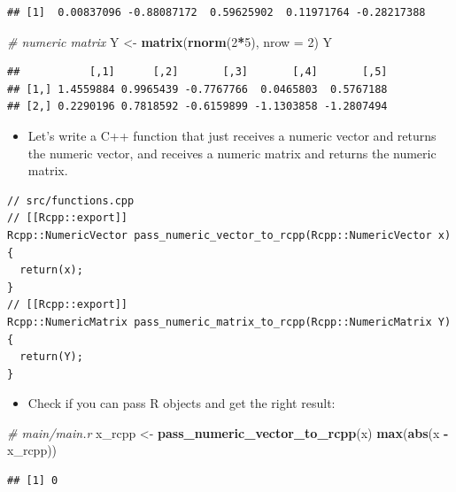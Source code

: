 \documentclass[]{book}
\newenvironment{Shaded}{\begin{snugshade}}{\end{snugshade}}
\newcommand{\KeywordTok}[1]{\textcolor[rgb]{0.13,0.29,0.53}{\textbf{#1}}}
\newcommand{\DataTypeTok}[1]{\textcolor[rgb]{0.13,0.29,0.53}{#1}}
\newcommand{\DecValTok}[1]{\textcolor[rgb]{0.00,0.00,0.81}{#1}}
\newcommand{\StringTok}[1]{\textcolor[rgb]{0.31,0.60,0.02}{#1}}
\newcommand{\CommentTok}[1]{\textcolor[rgb]{0.56,0.35,0.01}{\textit{#1}}}
\newcommand{\OperatorTok}[1]{\textcolor[rgb]{0.81,0.36,0.00}{\textbf{#1}}}
\newcommand{\NormalTok}[1]{#1}
\providecommand{\tightlist}{%
  \setlength{\itemsep}{0pt}\setlength{\parskip}{0pt}}
\begin{document}
\begin{verbatim}
## [1]  0.00837096 -0.88087172  0.59625902  0.11971764 -0.28217388
\end{verbatim}

\begin{Shaded}
\begin{Highlighting}[]
\CommentTok{# numeric matrix}
\NormalTok{Y <-}\StringTok{ }\KeywordTok{matrix}\NormalTok{(}\KeywordTok{rnorm}\NormalTok{(}\DecValTok{2}\OperatorTok{*}\DecValTok{5}\NormalTok{), }\DataTypeTok{nrow =} \DecValTok{2}\NormalTok{)}
\NormalTok{Y}
\end{Highlighting}
\end{Shaded}

\begin{verbatim}
##           [,1]      [,2]       [,3]       [,4]       [,5]
## [1,] 1.4559884 0.9965439 -0.7767766  0.0465803  0.5767188
## [2,] 0.2290196 0.7818592 -0.6159899 -1.1303858 -1.2807494
\end{verbatim}

\begin{itemize}
\tightlist
\item
  Let's write a C++ function that just receives a numeric vector and
  returns the numeric vector, and receives a numeric matrix and returns
  the numeric matrix.
\end{itemize}

\begin{verbatim}
// src/functions.cpp
// [[Rcpp::export]]
Rcpp::NumericVector pass_numeric_vector_to_rcpp(Rcpp::NumericVector x) {
  return(x);
}
// [[Rcpp::export]]
Rcpp::NumericMatrix pass_numeric_matrix_to_rcpp(Rcpp::NumericMatrix Y) {
  return(Y);
}
\end{verbatim}

\begin{itemize}
\tightlist
\item
  Check if you can pass R objects and get the right result:
\end{itemize}

\begin{Shaded}
\begin{Highlighting}[]
\CommentTok{# main/main.r}
\NormalTok{x_rcpp <-}\StringTok{ }\KeywordTok{pass_numeric_vector_to_rcpp}\NormalTok{(x)}
\KeywordTok{max}\NormalTok{(}\KeywordTok{abs}\NormalTok{(x }\OperatorTok{-}\StringTok{ }\NormalTok{x_rcpp))}
\end{Highlighting}
\end{Shaded}

\begin{verbatim}
## [1] 0
\end{verbatim}
\end{document}
